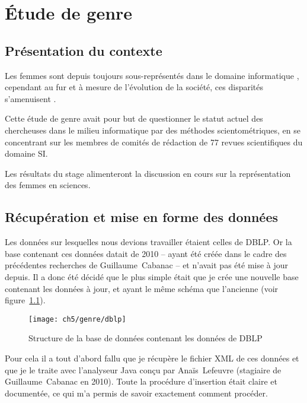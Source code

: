 \cleardoublepage
{}

\chapter{Étude de genre}\label{cha:genre}



	\section{Présentation du contexte}
		Les femmes sont depuis toujours sous-représentés dans le domaine informatique \citep{depalma, stross}, cependant au fur et à mesure de l'évolution de la société, ces disparités s'amenuisent \citep{van}.
		
		 Cette étude de genre avait pour but de questionner le statut actuel des chercheuses dans le milieu informatique par des méthodes scientométriques, en se concentrant sur les membres de comités de rédaction de 77 revues scientifiques du domaine SI.
		 
		Les résultats du stage alimenteront la discussion en cours sur la représentation des femmes en sciences.

	
	\section{Récupération et mise en forme des données}
		Les données sur lesquelles nous devions travailler étaient celles de DBLP. Or la base contenant ces données datait de 2010 -- ayant été créée dans le cadre des précédentes recherches de Guillaume~Cabanac -- et n'avait pas été mise à jour depuis. Il a donc été décidé que le plus simple était que je crée une nouvelle base contenant les données à jour, et ayant le même schéma que l'ancienne (voir figure~\ref{fig:mcdDblp}).
		
		\begin{figure}[h]
			\centering
			\texttt{[image: ch5/genre/dblp]}
			\caption{Structure de la base de données contenant les données de DBLP \citep{lefeuvre, cabanac2011}}\label{fig:mcdDblp}
		\end{figure}
		
		Pour cela il a tout d'abord fallu que je récupère le fichier XML de ces données et que je le traite avec l'analyseur Java conçu par Anaïs~Lefeuvre (stagiaire de Guillaume~Cabanac en 2010). Toute la procédure d'insertion était claire et documentée, ce qui m'a permis de savoir exactement comment procéder.
		

